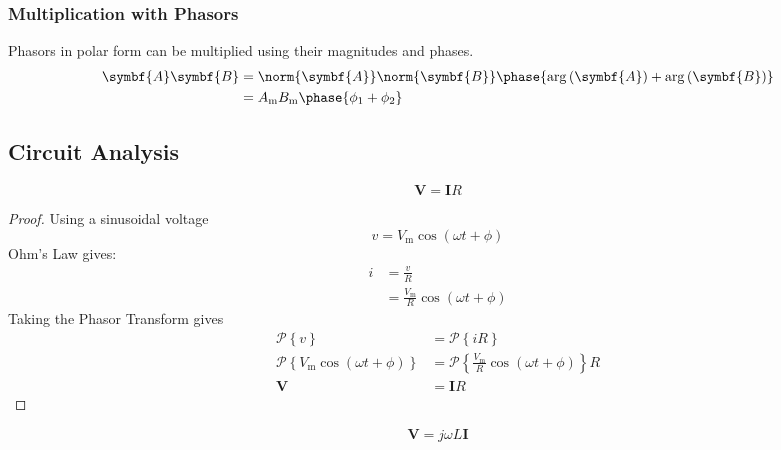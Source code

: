 \documentclass{article}
\begin{document}
\subsubsection{Multiplication with Phasors}
Phasors in polar form can be multiplied using their magnitudes and
phases.
\begin{align*}
    \symbf{A} \symbf{B} & = \norm{\symbf{A}} \norm{\symbf{B}} \phase{\arg{\left( \symbf{A} \right)} + \arg{\left( \symbf{B} \right)}} \\
                        & = A_{\mathrm{m}} B_{\mathrm{m}} \phase{\phi_1 + \phi_2}
\end{align*}
\subsection{Circuit Analysis}
\begin{theorem}
    \begin{equation*}
        \symbf{V} = \symbf{I} R
    \end{equation*}
\end{theorem}
\begin{proof}
    Using a sinusoidal voltage
    \begin{equation*}
        v = V_{\mathrm{m}}\cos{\left( \omega t + \phi \right)}
    \end{equation*}
    Ohm's Law gives:
    \begin{align*}
        i & = \frac{v}{R}                                                   \\
          & = \frac{V_{\mathrm{m}}}{R} \cos{\left( \omega t + \phi \right)}
    \end{align*}
    Taking the Phasor Transform gives
    \begin{align*}
        \mathscr{P}\left\{ v \right\}                                                  & = \mathscr{P}\left\{ iR \right\}                                                              \\
        \mathscr{P}\left\{ V_{\mathrm{m}}\cos{\left( \omega t + \phi \right)} \right\} & = \mathscr{P}\left\{ \frac{V_{\mathrm{m}}}{R} \cos{\left( \omega t + \phi \right)} \right\} R \\
        \symbf{V}                                                                      & = \symbf{I} R
    \end{align*}
\end{proof}
\begin{theorem}
    \begin{equation*}
        \symbf{V} = j\omega L\symbf{I}
    \end{equation*}
\end{theorem}
\end{document}
